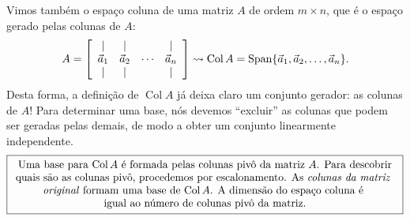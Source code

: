 \documentclass[../livro.tex]{subfiles}  %
\begin{document}
Vimos também o espaço coluna de uma matriz $A$ de ordem $m \times n$, que é o espaço gerado pelas colunas de $A$:
\begin{equation}
A =
\left[
\begin{array}{cccc}
| & | &  & | \\
\vec{a}_1 & \vec{a}_2 & \cdots & \vec{a}_n \\
| & | &        & | \\
\end{array}
\right] \rightsquigarrow
\operatorname{Col} A = \operatorname{Span} \{ \vec{a}_1, \vec{a}_2, \dots, \vec{a}_n\}.
\end{equation} Desta forma, a definição de $\operatorname{Col} A$ já deixa claro um conjunto gerador: as colunas de $A$! Para determinar uma base, nós devemos ``excluir'' as colunas que podem ser geradas pelas demais, de modo a obter um conjunto linearmente independente.
\begin{equation}
\boxed{
	\begin{array}{c}
	\text{Uma base para $\operatorname{Col} A$ é formada pelas colunas pivô da matriz $A$. Para descobrir} \\
	\text{quais são as colunas pivô, procedemos por escalonamento. As \textit{colunas da matriz} } \\
	\text{\textit{original} formam uma base de $\operatorname{Col} A$. A dimensão do espaço coluna é } \\
	\text{igual ao número de colunas pivô da matriz.}
	\end{array}
}
\end{equation}
\end{document}
